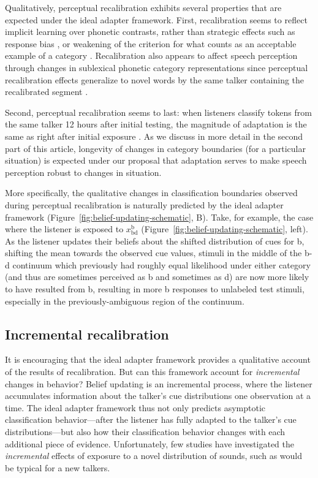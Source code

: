 Qualitatively, perceptual recalibration exhibits several properties that are expected under the ideal adapter framework. First, recalibration seems to reflect implicit learning over phonetic contrasts, rather than strategic effects such as response bias \cite{Clarke-Davidson2008}, or weakening of the criterion for what counts as an acceptable example of a category \autocite[][but see next section]{Maye2008a}.
Recalibration also appears to affect speech perception through changes in sublexical phonetic category representations since perceptual recalibration effects generalize to novel words by the same talker containing the recalibrated segment \cite{McQueen2006}.

Second, perceptual recalibration seems to last: when listeners classify tokens from the same talker 12 hours after initial testing, the magnitude of adaptation is the same as right after initial exposure \cite{Eisner2006}. As we discuss in more detail in the second part of this article, longevity of changes in category boundaries (for a particular situation) is expected under our proposal that adaptation serves to make speech perception robust to changes in situation.

More specifically, the qualitative changes in classification boundaries observed during perceptual recalibration is naturally predicted by the ideal adapter framework (Figure~\ref{fig:belief-updating-schematic}, B).  Take, for example, the case where the listener is exposed to $x_\mathrm{bd}^\mathrm{b}$ (Figure~\ref{fig:belief-updating-schematic}, left).  As the listener updates their beliefs about the shifted distribution of cues for \ph b, shifting the mean towards the observed cue values, stimuli in the middle of the \ph b-\ph d continuum which previously had roughly equal likelihood under either category (and thus are sometimes perceived as \ph b and sometimes as \ph d) are now more likely to have resulted from \ph b, resulting in more \ph b responses to unlabeled test stimuli, especially in the previously-ambiguous region of the continuum.

\subsection{Incremental recalibration}
\label{sec:incr-recal}

It is encouraging that the ideal adapter framework provides a qualitative account of the results of recalibration.  But can this framework account for \emph{incremental} changes in behavior?  Belief updating is an incremental process, where the listener accumulates information about the talker's cue distributions one observation at a time.  The ideal adapter framework thus not only predicts asymptotic classification behavior---after the listener has fully adapted to the talker's cue distributions---but also how their classification behavior changes with each additional piece of evidence.
Unfortunately, few studies have investigated the \emph{incremental} effects of exposure to a novel distribution of sounds, such as would be typical for a new talkers.

